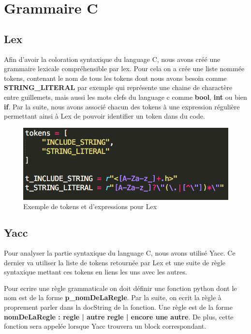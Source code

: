 \documentclass[a4paper,12pt]{article}
\begin{document}
\newpage

\section{Grammaire C}

	\subsection{Lex}

		Afin d'avoir la coloration syntaxique du language C, nous avons créé une grammaire lexicale compréhensible par lex. Pour cela on a crée une liste nommée tokens, contenant le nom de tous les tokens dont nous avons besoin comme \textbf{STRING\_LITERAL} par exemple qui représente une chaine de charactère entre guillemets, mais aussi les mots clefs du language c comme \textbf{bool}, \textbf{int} ou bien \textbf{if}. Par la suite, nous avons associé chacun des tokens à une expression régulière permettant ainsi à Lex de pouvoir identifier un token dans du code.
		
		\begin{figure}[h!]
				\begin{center}
					\includegraphics[scale=0.45]{images/lexC}
					\caption{Exemple de tokens et d'expressions pour Lex}
				\end{center}
		\end{figure}

	\subsection{Yacc}

		Pour analyser la partie syntaxique du language C, nous avons utilisé Yacc. Ce dernier va utiliser la liste de tokens retournée par Lex et une suite de règle syntaxique mettant ces tokens en liens les uns avec les autres.

		Pour ecrire une règle grammaticale on doit définir une fonction python dont le nom est de la forme \textbf{p\_nomDeLaRegle}. Par la suite, on ecrit la règle à proprement parler dans la docString de la fonction. Une règle est de la forme \textbf{nomDeLaRegle : regle | autre regle | encore une autre}. De plus, cette fonction sera appelée lorsque Yacc trouvera un block correspondant.
		
\end{document}

